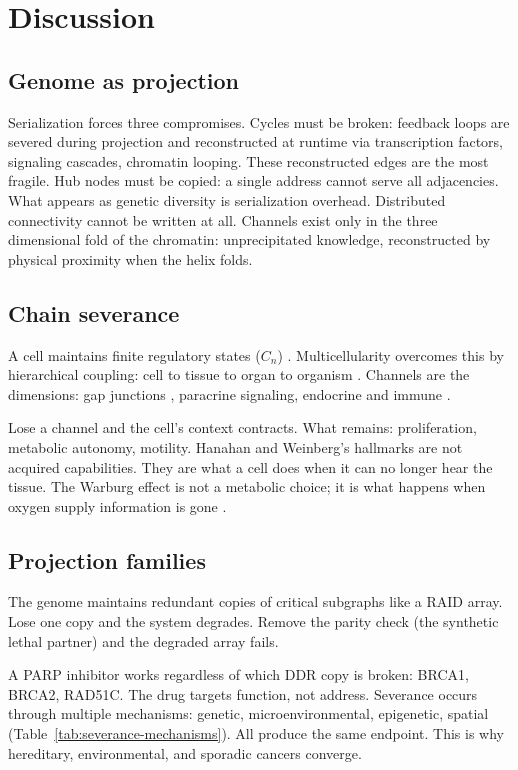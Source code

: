 \documentclass[11pt]{article}
\begin{document}
\section*{Discussion}

\subsection*{Genome as projection}

Serialization forces three compromises. Cycles must be broken:
feedback loops are severed during projection and reconstructed at
runtime via transcription factors, signaling cascades, chromatin
looping. These reconstructed edges are the most fragile. Hub nodes
must be copied: a single address cannot serve all adjacencies. What
appears as genetic diversity is serialization overhead. Distributed
connectivity cannot be written at all. Channels exist only in the
three dimensional fold of the chromatin: unprecipitated knowledge,
reconstructed by physical proximity when the helix folds.

\subsection*{Chain severance}

A cell maintains finite regulatory states ($C_n$) \cite{Cowan2001}.
Multicellularity overcomes this by hierarchical coupling: cell to
tissue to organ to organism \cite{McCarthy2026b}. Channels are the
dimensions: gap junctions \cite{Aasen2016}, paracrine signaling,
endocrine and immune \cite{Hanahan2011}.

Lose a channel and the cell's context contracts. What remains:
proliferation, metabolic autonomy, motility. Hanahan and Weinberg's
hallmarks \cite{Hanahan2011} are not acquired capabilities. They are
what a cell does when it can no longer hear the tissue. The Warburg
effect is not a metabolic choice; it is what happens when oxygen
supply information is gone \cite{Warburg1956}.

\subsection*{Projection families}

The genome maintains redundant copies of critical subgraphs like a
RAID array. Lose one copy and the system degrades. Remove the parity
check (the synthetic lethal partner) and the degraded array fails.

A PARP inhibitor works regardless of which DDR copy is broken:
BRCA1, BRCA2, RAD51C. The drug targets function, not address.
Severance occurs through multiple mechanisms: genetic,
microenvironmental, epigenetic, spatial
(Table~\ref{tab:severance-mechanisms}). All produce the same
endpoint. This is why hereditary, environmental, and sporadic
cancers converge.
\end{document}
